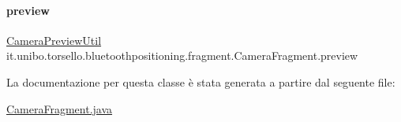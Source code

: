 \hypertarget{classit_1_1unibo_1_1torsello_1_1bluetoothpositioning_1_1fragment_1_1CameraFragment_af14f8f1e4107c9a9063cf70d1fbb5bb5_af14f8f1e4107c9a9063cf70d1fbb5bb5}{}\label{classit_1_1unibo_1_1torsello_1_1bluetoothpositioning_1_1fragment_1_1CameraFragment_af14f8f1e4107c9a9063cf70d1fbb5bb5_af14f8f1e4107c9a9063cf70d1fbb5bb5} 
\paragraph{\texorpdfstring{preview}{preview}}
{\footnotesize\ttfamily \hyperlink{classit_1_1unibo_1_1torsello_1_1bluetoothpositioning_1_1util_1_1CameraPreviewUtil}{Camera\+Preview\+Util} it.\+unibo.\+torsello.\+bluetoothpositioning.\+fragment.\+Camera\+Fragment.\+preview\hspace{0.3cm}{\ttfamily [private]}}



La documentazione per questa classe è stata generata a partire dal seguente file\+:\begin{DoxyCompactItemize}
\item 
\hyperlink{CameraFragment_8java}{Camera\+Fragment.\+java}\end{DoxyCompactItemize}
